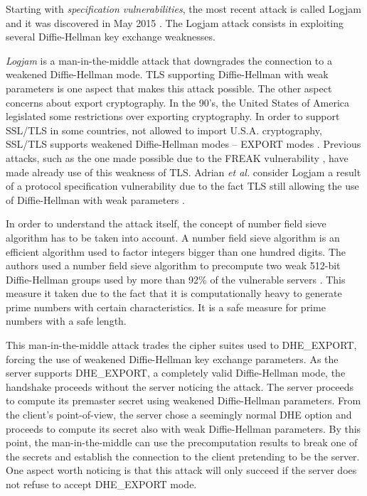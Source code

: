 \documentclass{sig-alternate-05-2015}
\begin{document}
Starting with \textit{specification vulnerabilities}, the most recent attack is called Logjam and it was discovered in May 2015 \cite{Adrian2015}. The Logjam attack consists in exploiting several Diffie-Hellman key exchange weaknesses.

\textit{Logjam} is a man-in-the-middle attack that downgrades the connection to a weakened Diffie-Hellman mode. TLS supporting Diffie-Hellman with weak parameters is one aspect that makes this attack possible. The other aspect concerns about export cryptography. In the 90's, the United States of America legislated some restrictions over exporting cryptography. In order to support SSL/TLS in some countries, not allowed to import U.S.A. cryptography, SSL/TLS supports weakened Diffie-Hellman modes -- EXPORT modes \cite{Logjam-explained}.
Previous attacks, such as the one made possible due to the FREAK vulnerability \cite{Beurdouche2015}, have made already use of this weakness of TLS.
Adrian \textit{et al.} consider Logjam a result of a protocol specification vulnerability due to the fact TLS still allowing the use of Diffie-Hellman with weak parameters \cite{Adrian2015}.

In order to understand the attack itself, the concept of number field sieve algorithm has to be taken into account. A number field sieve algorithm is an efficient algorithm used to factor integers bigger than one hundred digits.
The authors used a number field sieve algorithm to precompute two weak 512-bit Diffie-Hellman groups used by more than 92\% of the vulnerable servers \cite{Adrian2015}. This measure it taken due to the fact that it is computationally heavy to generate prime numbers with certain characteristics. It is a safe measure for prime numbers with a safe length.

This man-in-the-middle attack trades the cipher suites used to DHE\_EXPORT, forcing the use of weakened Diffie-Hellman key exchange parameters. As the server supports DHE\_EXPORT, a completely valid Diffie-Hellman mode, the handshake proceeds without the server noticing the attack. The server proceeds to compute its premaster secret using weakened Diffie-Hellman parameters. From the client's point-of-view, the server chose a seemingly normal DHE option and proceeds to compute its secret also with weak Diffie-Hellman parameters. By this point, the man-in-the-middle can use the precomputation results to break one of the secrets and establish the connection to the client pretending to be the server.  One aspect worth noticing is that this attack will only succeed if the server does not refuse to accept DHE\_EXPORT mode.
\end{document}
